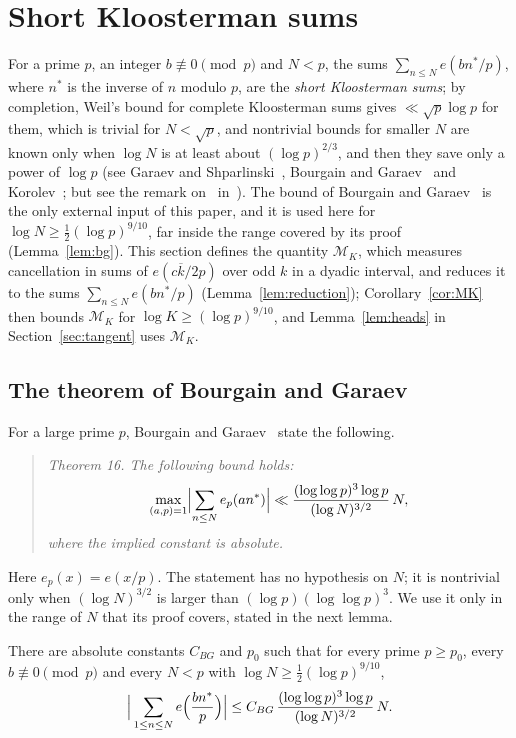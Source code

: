 \section{Short Kloosterman sums}\label{sec:kloosterman}

For a prime $p$, an integer $b\not\equiv0\pmod p$ and $N<p$, the sums $\sum_{n\le N}e(bn^*/p)$, where $n^*$ is the inverse of $n$ modulo $p$, are the \emph{short Kloosterman sums}; by completion, Weil's bound for complete Kloosterman sums gives $\ll\sqrt p\log p$ for them, which is trivial for $N<\sqrt p$, and nontrivial bounds for smaller $N$ are known only when $\log N$ is at least about $(\log p)^{2/3}$, and then they save only a power of $\log p$ (see Garaev and Shparlinski~\cite[\S1.1]{b12}, Bourgain and Garaev~\cite{b8,b9} and Korolev~\cite{b17}; but see the remark on~\cite{b17} in~\cite[\S1.1]{b12}). The bound of Bourgain and Garaev~\cite{b8} is the only external input of this paper, and it is used here for $\log N\ge\frac12(\log p)^{9/10}$, far inside the range covered by its proof (Lemma~\ref{lem:bg}). This section defines the quantity $\mathcal{M}_K$, which measures cancellation in sums of $e(c\overline{k}/2p)$ over odd $k$ in a dyadic interval, and reduces it to the sums $\sum_{n\le N}e(bn^*/p)$ (Lemma~\ref{lem:reduction}); Corollary~\ref{cor:MK} then bounds $\mathcal{M}_K$ for $\log K\ge(\log p)^{9/10}$, and Lemma~\ref{lem:heads} in Section~\ref{sec:tangent} uses $\mathcal{M}_K$.

\subsection{The theorem of Bourgain and Garaev}
For a large prime $p$, Bourgain and Garaev~\cite[Theorem~16]{b8} state the following.
\begin{quote}
\emph{Theorem 16. The following bound holds:}
\[
\max_{(a,p)=1}\Bigl|\sum_{n\le N}e_p(an^*)\Bigr|\ll\frac{(\log\log p)^3\log p}{(\log N)^{3/2}}\,N,
\]
\emph{where the implied constant is absolute.}
\end{quote}
Here $e_p(x)=e(x/p)$. The statement has no hypothesis on $N$; it is nontrivial only when $(\log N)^{3/2}$ is larger than $(\log p)(\log\log p)^3$. We use it only in the range of $N$ that its proof covers, stated in the next lemma.

\begin{lemma}\label{lem:bg}
There are absolute constants $C_{BG}$ and $p_0$ such that for every prime $p\ge p_0$, every $b\not\equiv0\pmod p$ and every $N<p$ with $\log N\ge\frac12(\log p)^{9/10}$,
\[
\Big|\sum_{1\le n\le N}e\Bigl(\frac{bn^*}{p}\Bigr)\Big|\le C_{BG}\,\frac{(\log\log p)^3\log p}{(\log N)^{3/2}}\,N.
\]
\end{lemma}


